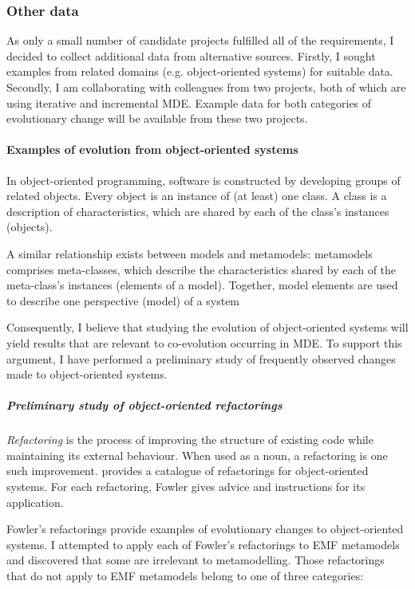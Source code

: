\subsubsection{Other data} %
\label{ssub:other_data}
As only a small number of candidate projects fulfilled all of the requirements, I decided to collect additional data from alternative sources. Firstly, I sought examples from related domains (e.g. object-oriented systems) for suitable data. Secondly, I am collaborating with colleagues from two projects, both of which are using iterative and incremental MDE. Example data for both categories of evolutionary change will be available from these two projects.

\paragraph{Examples of evolution from object-oriented systems} %
\label{par:examples_of_evolution_from_object_oriented_systems}
In object-oriented programming, software is constructed by developing groups of related objects. Every object is an instance of (at least) one class. A class is a description of characteristics, which are shared by each of the class's instances (objects).

A similar relationship exists between models and metamodels: metamodels comprises meta-classes, which describe the characteristics shared by each of the meta-class's instances (elements of a model). Together, model elements are used to describe one perspective (model) of a system

Consequently, I believe that studying the evolution of object-oriented systems will yield results that are relevant to co-evolution occurring in MDE. To support this argument, I have performed a preliminary study of frequently observed changes made to object-oriented systems.

\subparagraph{Preliminary study of object-oriented refactorings} %
\label{subp:preliminary_study_of_object_oriented_refactorings}
\emph{Refactoring} is the process of improving the structure of existing code while maintaining its external behaviour. When used as a noun, a refactoring is one such improvement. \cite{fowler99refactoring} provides a catalogue of refactorings for object-oriented systems. For each refactoring, Fowler gives advice and instructions for its application.

Fowler's refactorings provide examples of evolutionary changes to object-oriented systems. I attempted to apply each of Fowler's refactorings to EMF metamodels and discovered that some are irrelevant to metamodelling. Those refactorings that do not apply to EMF metamodels belong to one of three categories:

